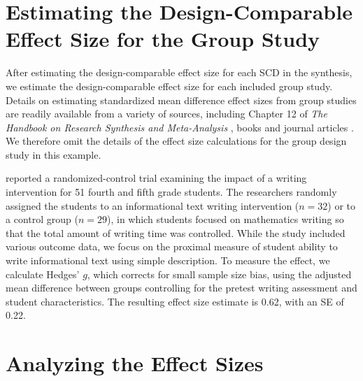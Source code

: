 \documentclass[
]{book}
\begin{document}
\hypertarget{estimating-the-design-comparable-effect-size-for-the-group-study}{%
\section{Estimating the Design-Comparable Effect Size for the Group Study}\label{estimating-the-design-comparable-effect-size-for-the-group-study}}

After estimating the design-comparable effect size for each SCD in the synthesis, we estimate the design-comparable effect size for each included group study. Details on estimating standardized mean difference effect sizes from group studies are readily available from a variety of sources, including Chapter 12 of \emph{The Handbook on Research Synthesis and Meta-Analysis} \citep{Borenstein2019effect}, books \citep[e.g.,][]{borenstein2021introduction} and journal articles \citep[e.g.,][]{Hedges1981distribution, Hedges2007effect}. We therefore omit the details of the effect size calculations for the group design study in this example.

\citet{hebert2018Writing} reported a randomized-control trial examining the impact of a writing intervention for 51 fourth and fifth grade students. The researchers randomly assigned the students to an informational text writing intervention (\(n = 32\)) or to a control group (\(n = 29\)), in which students focused on mathematics writing so that the total amount of writing time was controlled. While the \citet{hebert2018Writing} study included various outcome data, we focus on the proximal measure of student ability to write informational text using simple description. To measure the effect, we calculate Hedges' \(g\), which corrects for small sample size bias, using the adjusted mean difference between groups controlling for the pretest writing assessment and student characteristics. The resulting effect size estimate is 0.62, with an SE of 0.22.

\hypertarget{analyzing-the-effect-sizes-2}{%
\section{Analyzing the Effect Sizes}\label{analyzing-the-effect-sizes-2}}
\end{document}
